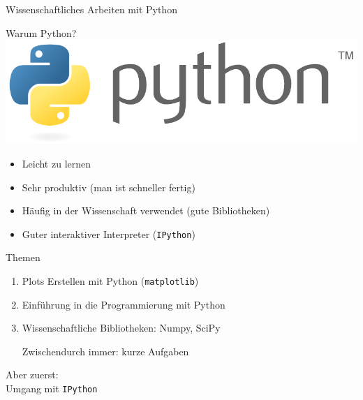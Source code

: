 
\begin{frame}
  \centering
  \Huge Wissenschaftliches Arbeiten mit Python
\end{frame}

\begin{frame}{Warum Python?}
  \includegraphics[width=\textwidth]{logos/python.pdf}
  \begin{itemize}
    \item Leicht zu lernen
    \item Sehr produktiv (man ist schneller fertig)
    \item Häufig in der Wissenschaft verwendet (gute Bibliotheken)
    \item Guter interaktiver Interpreter (\texttt{IPython})
  \end{itemize}
\end{frame}

\begin{frame}{Themen}
  \begin{enumerate}
    \item {\large Plots Erstellen mit Python (\texttt{matplotlib})}
    \item {\large Einführung in die Programmierung mit Python}
    \item {\large Wissenschaftliche Bibliotheken: Numpy, SciPy}

    Zwischendurch immer: kurze Aufgaben
  \end{enumerate}
\end{frame}

\begin{frame}
  \centering
  \Huge Aber zuerst:\\ Umgang mit \texttt{IPython}
\end{frame}
